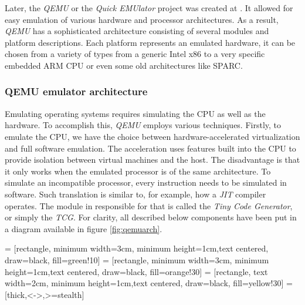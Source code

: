 Later, the \textit{QEMU} or the \textit{Quick EMUlator} project was created at \cite{qemurepo}. It allowed for easy emulation of various hardware and processor architectures. As a result, \textit{QEMU} has a sophisticated architecture consisting of several modules and platform descriptions. Each platform represents an emulated hardware, it can be chosen from a variety of types from a generic Intel x86 to a very specific embedded ARM CPU or even some old architectures like SPARC.

\subsubsection{QEMU emulator architecture}

Emulating operating systems requires simulating the CPU as well as the hardware. To accomplish this, \textit{QEMU} employs various techniques. Firstly, to emulate the CPU, we have the choice between hardware-accelerated virtualization and full software emulation. The acceleration uses features built into the CPU to provide isolation between virtual machines and the host. The disadvantage is that it only works when the emulated processor is of the same architecture. To simulate an incompatible processor, every instruction needs to be simulated in software. Such translation is similar to, for example, how a \textit{JIT} compiler operates. The module in  responsible for that is called the \textit{Tiny Code Generator}, or simply the \textit{TCG}. For clarity, all described below components have been put in a diagram available in figure \ref{fig:qemuarch}.

 = [rectangle, minimum width=3cm, minimum height=1cm,text centered, draw=black, fill=green!10]
 = [rectangle, minimum width=3cm, minimum height=1cm,text centered, draw=black, fill=orange!30]
 = [rectangle, text width=2cm, minimum height=1cm,text centered, draw=black, fill=yellow!30]
 = [thick,<->,>=stealth]

